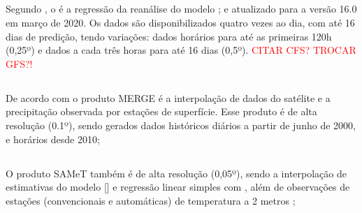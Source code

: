 
\subsection{}

Segundo , o  é a regressão da reanálise do modelo ; e atualizado para a versão 16.0 em março de 2020. Os dados são disponibilizados quatro vezes ao dia, com até 16 dias de predição, tendo variações: dados horários para até as primeiras 120h (0,25º) e dados a cada três horas para até 16 dias (0,5º). \textcolor{red}{CITAR CFS? TROCAR GFS?!}

\subsection{}

De acordo com  o produto \acrshort{MERGE} é a interpolação de dados do satélite  e a precipitação observada por estações de superfície. Esse produto é de alta resolução (0.1º), sendo gerados dados históricos  diários a partir de junho de 2000, e horários desde 2010;

\subsection{}
 O produto \acrshort{SAMeT} também é de alta resolução (0,05º), sendo a interpolação de estimativas do modelo  [] e regressão linear simples com , além de observações de estações (convencionais e automáticas) de temperatura a 2 metros \cite{Rozante2021SAMeT};


